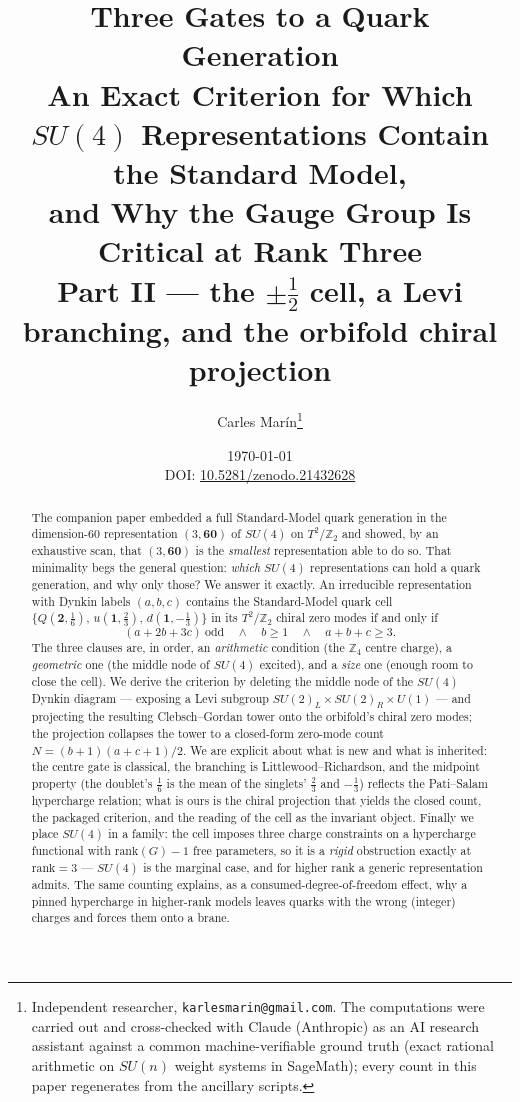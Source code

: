 \documentclass[11pt,a4paper]{article}
\title{\textbf{Three Gates to a Quark Generation}\\[3pt]
\textbf{An Exact Criterion for Which $SU(4)$ Representations Contain the Standard Model,\\
and Why the Gauge Group Is Critical at Rank Three}\\[5pt]
\large\textnormal{Part II --- the $\pm\tfrac12$ cell, a Levi branching, and the orbifold
chiral projection}}
\author{Carles Mar\'in\thanks{Independent researcher, \texttt{karlesmarin@gmail.com}.
The computations were carried out and cross-checked with Claude (Anthropic) as an AI
research assistant against a common machine-verifiable ground truth (exact rational
arithmetic on $SU(n)$ weight systems in SageMath); every count in this paper regenerates
from the ancillary scripts.}}
\date{\today\\[2pt]\small DOI: \href{https://doi.org/10.5281/zenodo.21432628}{10.5281/zenodo.21432628}}
\newcommand{\ZZ}{\mathbb{Z}}
\begin{document}
\maketitle

\begin{abstract}
\noindent
The companion paper embedded a full Standard-Model quark generation in the
dimension-$60$ representation $(3,\mathbf{60})$ of $SU(4)$ on $T^2/\mathbb{Z}_2$ and
showed, by an exhaustive scan, that $(3,\mathbf{60})$ is the \emph{smallest} representation
able to do so. That minimality begs the general question: \emph{which} $SU(4)$
representations can hold a quark generation, and why only those? We answer it exactly. An
irreducible representation with Dynkin labels $(a,b,c)$ contains the Standard-Model quark
cell $\{Q(\mathbf{2},\tfrac16),\,u(\mathbf{1},\tfrac23),\,d(\mathbf{1},-\tfrac13)\}$ in its
$T^2/\mathbb{Z}_2$ chiral zero modes if and only if
\[
(a+2b+3c)\ \text{odd}\quad\wedge\quad b\ge 1\quad\wedge\quad a+b+c\ge 3 .
\]
The three clauses are, in order, an \emph{arithmetic} condition (the $\ZZ_4$ centre
charge), a \emph{geometric} one (the middle node of $SU(4)$ excited), and a \emph{size}
one (enough room to close the cell). We derive the criterion by deleting the middle node
of the $SU(4)$ Dynkin diagram --- exposing a Levi subgroup
$SU(2)_L\times SU(2)_R\times U(1)$ --- and projecting the resulting Clebsch--Gordan tower
onto the orbifold's chiral zero modes; the projection collapses the tower to a closed-form
zero-mode count $N=(b+1)(a+c+1)/2$. We are explicit about what is new and what is
inherited: the centre gate is classical, the branching is Littlewood--Richardson, and the
midpoint property (the doublet's $\tfrac16$ is the mean of the singlets' $\tfrac23$ and
$-\tfrac13$) reflects the Pati--Salam hypercharge relation; what is ours is the chiral
projection that yields the closed count, the packaged
criterion, and the reading of the cell as the invariant object. Finally we place $SU(4)$
in a family: the cell imposes three charge constraints on a hypercharge functional with
$\mathrm{rank}(G)-1$ free parameters, so it is a \emph{rigid} obstruction exactly at
$\mathrm{rank}=3$ --- $SU(4)$ is the marginal case, and for higher rank a generic
representation admits. The same counting explains, as a consumed-degree-of-freedom effect,
why a pinned hypercharge in higher-rank models leaves quarks with the wrong (integer)
charges and forces them onto a brane.
\end{abstract}

\end{document}
